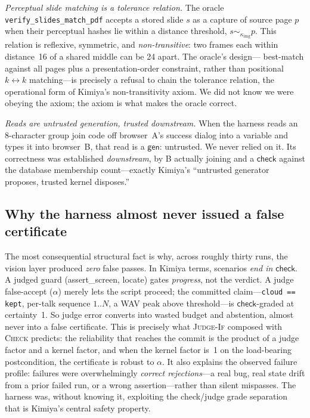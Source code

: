 \documentclass[acmsmall,screen,nonacm]{acmart}
\newcommand{\semeqk}[1]{\mathrel{\sim_{#1}}}
\newcommand{\gen}{\mathsf{gen}}
\newcommand{\checkk}{\mathsf{check}}
\newcommand{\ctx}{\kappa}
\theoremstyle{acmdefinition}%
\theoremstyle{acmplain}%
\begin{document}
\emph{Perceptual slide matching is a tolerance relation.} The oracle
\texttt{verify\_slides\_match\_pdf} accepts a stored slide $s$ as a
capture of source page $p$ when their perceptual hashes lie within a
distance threshold, $s\semeqk{\ctx_{\mathrm{img}}}p$. This relation is
reflexive, symmetric, and \emph{non-transitive}: two frames each within
distance~16 of a shared middle can be 24 apart. The oracle's design---
best-match against all pages plus a presentation-order constraint, rather
than positional $k\leftrightarrow k$ matching---is precisely a refusal to
chain the tolerance relation, the operational form of Kimiya's
non-transitivity axiom. We did not know we were obeying the axiom; the
axiom is what makes the oracle correct.

\emph{Reads are untrusted generation, trusted downstream.} When the
harness reads an 8-character group join code off browser~A's success
dialog into a variable and types it into browser~B, that read is a
$\gen$: untrusted. We never relied on it. Its correctness was established
\emph{downstream}, by B actually joining and a $\checkk$ against the
database membership count---exactly Kimiya's ``untrusted generator
proposes, trusted kernel disposes.''

\subsection{Why the harness almost never issued a false certificate}
\label{sec:false-cert}

The most consequential structural fact is why, across roughly thirty
runs, the vision layer produced \emph{zero} false passes. In Kimiya
terms, scenarios \emph{end in $\checkk$}. A judged guard
(\textsf{assert\_screen}, \textsf{locate}) gates \emph{progress}, not the
verdict. A judge false-accept ($\alpha$) merely lets the script proceed;
the committed claim---\texttt{cloud == kept}, per-talk sequence $1..N$, a
WAV peak above threshold---is $\checkk$-graded at certainty~1. So judge
error converts into wasted budget and abstention, almost never into a
false certificate. This is precisely what \textsc{Judge-If} composed with
\textsc{Check} predicts: the reliability that reaches the commit is the
product of a judge factor and a kernel factor, and when the kernel factor
is~1 on the load-bearing postcondition, the certificate is robust to
$\alpha$. It also explains the observed failure profile: failures were
overwhelmingly \emph{correct rejections}---a real bug, real state drift
from a prior failed run, or a wrong assertion---rather than silent
mispasses. The harness was, without knowing it, exploiting the
check/judge grade separation that is Kimiya's central safety property.
\end{document}
